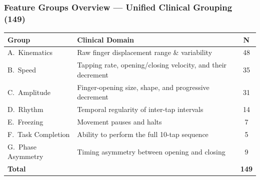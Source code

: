 \documentclass[aspectratio=169]{beamer}
\begin{document}
\begin{frame}
    \frametitle{Feature Groups Overview --- Unified Clinical Grouping (149)}
    \scriptsize\centering
    \begin{tabular}{llc}
        \toprule
        \textbf{Group} & \textbf{Clinical Domain} & \textbf{N} \\
        \midrule
        A.\ Kinematics      & Raw finger displacement range \& variability                & 48 \\
        B.\ Speed           & Tapping rate, opening/closing velocity, and their decrement & 35 \\
        C.\ Amplitude       & Finger-opening size, shape, and progressive decrement       & 31 \\
        D.\ Rhythm          & Temporal regularity of inter-tap intervals                  & 14 \\
        E.\ Freezing        & Movement pauses and halts                                   &  7 \\
        F.\ Task Completion & Ability to perform the full 10-tap sequence                 &  5 \\
        G.\ Phase Asymmetry & Timing asymmetry between opening and closing                &  9 \\
        \midrule
        \textbf{Total} & & \textbf{149} \\
        \bottomrule
    \end{tabular}\\[0.5em]
\end{frame}
\end{document}

